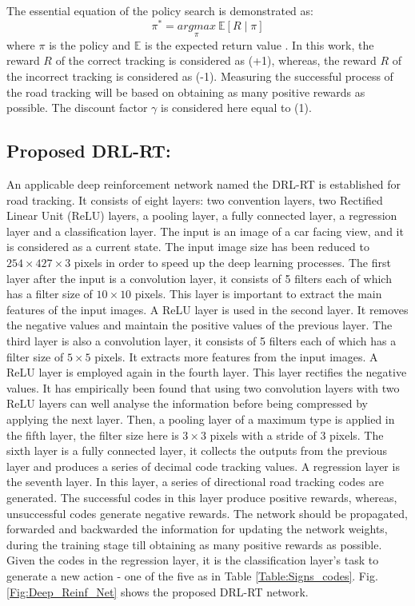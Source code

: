 \documentclass[a4paper,twoside]{article}
\begin{document}
The essential equation of the policy search is demonstrated as:
\begin{equation}
\pi^*=\underset{\pi}{argmax}~\mathbb{E} [R\mid\pi]
\label{Eq:MDP}
\end{equation}
where $\pi$ is the policy and $\mathbb{E}$ is the expected return value \cite{arulkumaran2017brief}. In this work, the reward $R$ of the correct tracking is considered as (+1), whereas, the reward $R$ of the incorrect tracking is considered as (-1). Measuring the successful process of the road tracking will be based on obtaining as many positive rewards as possible. The discount factor $\gamma$ is considered here equal to (1).

\subsection{Proposed DRL-RT:} 
An applicable deep reinforcement network named the DRL-RT is established for road tracking. It consists of eight layers: two convention layers, two Rectified Linear Unit (ReLU) layers, a pooling layer, a fully connected layer, a regression layer and a classification layer. The input is an image of a car facing view, and it is considered as a current state. The input image size has been reduced to $254 \times 427 \times 3$ pixels in order to speed up the deep learning processes. The first layer after the input is a convolution layer, it consists of 5 filters each of which has a filter size of $10 \times 10$ pixels. This layer is important to extract the main features of the input images. A ReLU layer is used in the second layer. It removes the negative values and maintain the positive values of the previous layer. The third layer is also a convolution layer, it consists of 5 filters each of which has a filter size of $5 \times 5$ pixels. It extracts more features from the input images. A ReLU layer is employed again in the fourth layer. This layer rectifies the negative values. It has empirically been found that using two convolution layers with two ReLU layers can well analyse the information before being compressed by applying the next layer. Then, a pooling layer of a maximum type is applied in the fifth layer, the filter size here is $3 \times 3$ pixels with a stride of 3 pixels. The sixth layer is a fully connected layer, it collects the outputs from the previous layer and produces a series of decimal code tracking values. A regression layer is the seventh layer. In this layer, a series of directional road tracking codes are generated. The successful codes in this layer produce positive rewards, whereas, unsuccessful codes generate negative rewards. The network should be propagated, forwarded and backwarded the information for updating the network weights, during the training stage till obtaining as many positive rewards as possible. Given the codes in the regression layer, it is the classification layer's task to generate a new action - one of the five as in Table \ref{Table:Signs_codes}. Fig. \ref{Fig:Deep_Reinf_Net} shows the proposed DRL-RT network.
\end{document}
